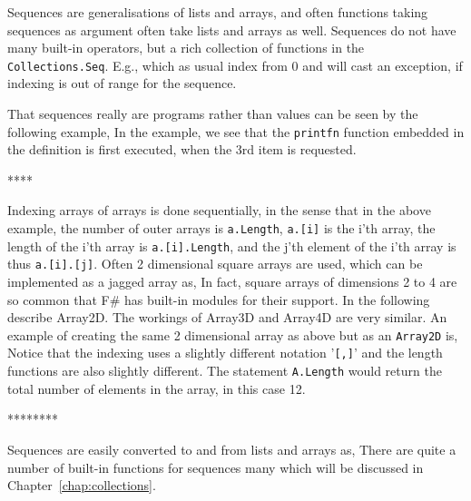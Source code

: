 Sequences are generalisations of lists and arrays, and often functions taking sequences as argument often take lists and arrays as well. Sequences do not have many built-in operators, but a rich collection of functions in the \lstinline!Collections.Seq!. E.g.,
%
%
which as usual index from 0 and will cast an exception, if indexing is out of range for the sequence. 

That sequences really are programs rather than values can be seen by the following example,
%
%
In the example, we see that the \lstinline!printfn! function embedded in the definition is first executed, when the 3rd item is requested.

****






Indexing arrays of arrays is done sequentially, in the sense that in the above example, the number of outer arrays is \verb|a.Length|,  \verb|a.[i]| is the i'th array, the length of the i'th array is \verb|a.[i].Length|, and the j'th element of the i'th array is thus \verb|a.[i].[j]|. Often 2 dimensional square arrays are used, which can be implemented as a jagged array as,
In fact, square arrays of dimensions 2 to 4 are so common that F\# has built-in modules for their support. In the following describe Array2D. The workings of Array3D and Array4D are very similar. An example of creating the same 2 dimensional array as above but as an \texttt{Array2D} is,
Notice that the indexing uses a slightly different notation '\verb|[,]|' and the length functions are also slightly different. The statement \verb|A.Length| would return the total number of elements in the array, in this case 12.

********

Sequences are easily converted to and from lists and arrays as,
%
%
There are quite a number of built-in functions for sequences many which will be discussed in Chapter~\ref{chap:collections}.
 


